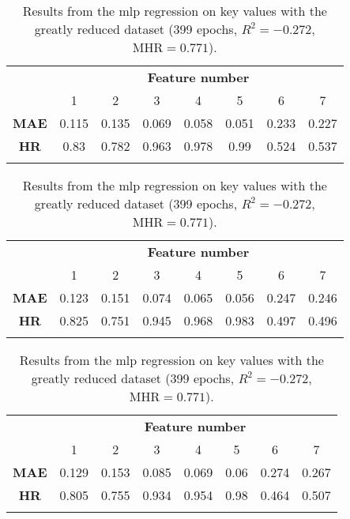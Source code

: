 \begin{table}
    \begin{center}
        \caption{\label{tab:mlpreg:kvs_comp} Results from the \ac{mlp} regression on key values with the complete dataset (235 epochs, \(R^2 = 0.474\), \(\text{MHR} = 0.801\)).}
        \begin{tabular}{ >{\bfseries}c c c c c c c c }
            \multirow{2}{*}{\textbf{Measure}} & \multicolumn{7}{c}{\textbf{Feature number}} \\
            & 1 & 2 & 3 & 4 & 5 & 6 & 7 \\
            \midrule
            MAE & 0.115 & 0.135 & 0.069 & 0.058 & 0.051 & 0.233 & 0.227 \\
            HR  & 0.83 & 0.782 & 0.963 & 0.978 & 0.99 & 0.524 & 0.537 \\
            \\
        \end{tabular}

        \caption{\label{tab:mlpreg:kvs_red} Results from the \ac{mlp} regression on key values with the reduced dataset (276 epochs, \(R^2 = 0.128\), \(\text{MHR} = 0.781\)).}
        \begin{tabular}{ >{\bfseries}c c c c c c c c }
            \multirow{2}{*}{\textbf{Measure}} & \multicolumn{7}{c}{\textbf{Feature number}} \\
            & 1 & 2 & 3 & 4 & 5 & 6 & 7 \\
            \midrule
            MAE & 0.123 & 0.151 & 0.074 & 0.065 & 0.056 & 0.247 & 0.246 \\
            HR  & 0.825 & 0.751 & 0.945 & 0.968 & 0.983 & 0.497 & 0.496 \\
            \\
        \end{tabular}

        \caption{\label{tab:mlpreg:kvs_vred} Results from the \ac{mlp} regression on key values with the greatly reduced dataset (399 epochs, \(R^2 = -0.272\), \(\text{MHR} = 0.771\)).}
        \begin{tabular}{ >{\bfseries}c c c c c c c c }
            \multirow{2}{*}{\textbf{Measure}} & \multicolumn{7}{c}{\textbf{Feature number}} \\
            & 1 & 2 & 3 & 4 & 5 & 6 & 7 \\
            \midrule
            MAE & 0.129 & 0.153 & 0.085 & 0.069 & 0.06 & 0.274 & 0.267 \\
            HR  & 0.805 & 0.755 & 0.934 & 0.954 & 0.98 & 0.464 & 0.507 \\
            \\
        \end{tabular}
    \end{center}
\end{table}

